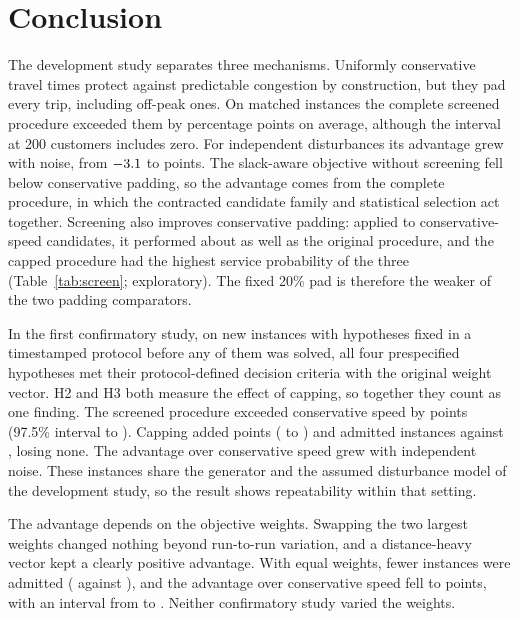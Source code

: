 \documentclass[11pt,a4paper]{article}
\begin{document}
\section{Conclusion}

The development study separates three mechanisms. Uniformly conservative travel
times protect against predictable congestion by construction, but they pad every
trip, including off-peak ones. On matched instances the complete screened
procedure exceeded them by \ProcConsRange{} percentage points on average,
although the interval at 200 customers includes zero. For independent
disturbances its advantage grew with noise, from $-3.1$ to
\SweepHighIndep{} points. The slack-aware objective without screening fell below
conservative padding, so the advantage comes from the complete procedure, in
which the contracted candidate family and statistical selection act together.
Screening also improves conservative padding: applied to conservative-speed
candidates, it performed about as well as the original procedure, and the capped
procedure had the highest service probability of the three
(Table~\ref{tab:screen}; exploratory). The fixed 20\% pad is therefore the weaker
of the two padding comparators.

In the first confirmatory study, on \ConfInstances{} new instances with
hypotheses fixed in a timestamped protocol before any of them was solved, all
four prespecified hypotheses met their protocol-defined decision criteria with the
original weight vector. H2 and H3 both measure the effect of capping, so
together they count as one finding. The screened procedure
exceeded conservative speed by \ConfHOneMean{} points (97.5\% interval
\ConfHOneLo{} to \ConfHOneHi{}). Capping added \ConfHTwoMean{} points
(\ConfHTwoLo{} to \ConfHTwoHi{}) and admitted \ConfHThreeK{} instances against
\ConfHThreeP{}, losing none. The advantage over conservative speed grew with
independent noise. These instances share the generator and the assumed
disturbance model of the development study, so the result shows repeatability
within that setting.

The advantage depends on the objective weights. Swapping the two largest weights
changed nothing beyond run-to-run variation, and a distance-heavy vector kept a
clearly positive advantage. With equal weights, fewer instances were admitted
(\WtEqualAdmitted{} against \WtBaseAdmitted{}), and the advantage over
conservative speed fell to \WtEqualPCMean{} points, with an interval from
\WtEqualPCLo{} to \WtEqualPCHi{}. Neither confirmatory study varied the
weights.
\end{document}
